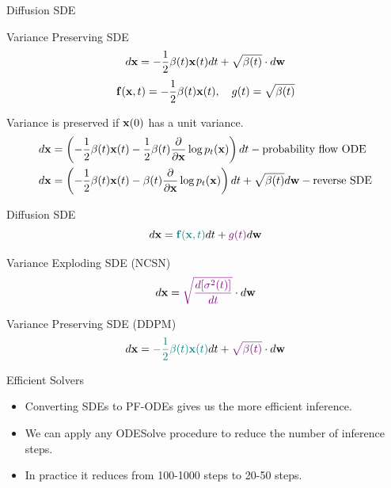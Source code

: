 \begin{frame}{Diffusion SDE}
	\begin{block}{Variance Preserving SDE}
		\vspace{-0.3cm}
		\[
			d \mathbf{x} = - \frac{1}{2} \beta(t) \mathbf{x}(t) dt + \sqrt{\beta(t)} \cdot d \mathbf{w}
		\]
		\[
			\mathbf{f}(\mathbf{x}, t) = - \frac{1}{2} \beta(t) \mathbf{x}(t) , \quad g(t) = \sqrt{\beta(t)} 
		\]
	\end{block}
	Variance is preserved if $\mathbf{x}(0)$ has a unit variance.
	\begin{align*}
		d\mathbf{x} &= \left(- \frac{1}{2} \beta(t) \mathbf{x}(t) - \frac{1}{2} \beta(t) \frac{\partial}{\partial \mathbf{x}} \log p_t(\mathbf{x}) \right) dt - \text{probability flow ODE} \\
		d\mathbf{x} &= \left(- \frac{1}{2} \beta(t) \mathbf{x}(t) - \beta(t) \frac{\partial}{\partial \mathbf{x}} \log p_t(\mathbf{x})\right) dt + \sqrt{\beta(t)} d \mathbf{w} - \text{reverse SDE}
	\end{align*}
\end{frame}
\begin{frame}{Diffusion SDE}
	\vspace{-0.5cm}
	\[
		d\mathbf{x} = {\color{teal}\mathbf{f}(\mathbf{x}, t)} dt + {\color{violet}g(t)} d \mathbf{w}
	\]
	\vspace{-0.5cm}
	\begin{block}{Variance Exploding SDE (NCSN)}
		\vspace{-0.3cm}
		\[
			d \mathbf{x} = {\color{violet}\sqrt{\frac{ d [\sigma^2(t)]}{dt}}} \cdot d \mathbf{w}
		\]
		\vspace{-0.5cm}
	\end{block}
	\begin{block}{Variance Preserving SDE (DDPM)}
		\vspace{-0.3cm}
		\[
			d \mathbf{x} = {\color{teal}- \frac{1}{2} \beta(t) \mathbf{x}(t)} dt + {\color{violet}\sqrt{\beta(t)}} \cdot d \mathbf{w}
		\]
		\vspace{-0.5cm}
	\end{block}
	\begin{block}{Efficient Solvers}
		\begin{itemize}
		\item Converting SDEs to PF-ODEs gives us the more efficient inference. 
		\item We can apply any ODESolve procedure to reduce the number of inference steps. 
		\item In practice it reduces from 100-1000 steps to 20-50 steps.
		\end{itemize}
	\end{block}
\end{frame}
